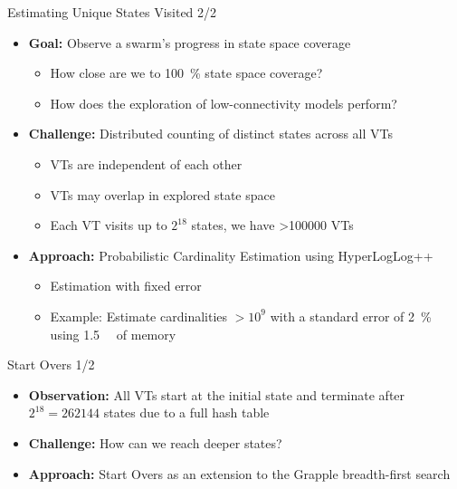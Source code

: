 \documentclass[aspectratio=169]{beamer}
\begin{document}
\begin{frame}{Estimating Unique States Visited 2/2}
    \begin{itemize}
        \item<1-> \textbf{Goal:} Observe a swarm's progress in state space coverage

              \begin{itemize}
                  \item How close are we to \SI{100}{\percent} state space coverage?
                  \item How does the exploration of low-connectivity models perform?
              \end{itemize}

        \item<2-> \textbf{Challenge:} Distributed counting of distinct states across all VTs

              \begin{itemize}
                  \item VTs are independent of each other
                  \item VTs may overlap in explored state space
                  \item Each VT visits up to $2^{18}$ states, we have >\num{100000} VTs
              \end{itemize}

        \item<3-> \textbf{Approach:} Probabilistic Cardinality Estimation using HyperLogLog++

              \begin{itemize}
                  \item Estimation with fixed error
                  \item Example: Estimate cardinalities $>10^9$ with a standard error of \SI{2}{\percent} using \SI{1.5}{\kilo\byte} of memory
              \end{itemize}
    \end{itemize}
\end{frame}

\begin{frame}{Start Overs 1/2}
    \begin{itemize}
        \item \textbf{Observation:} All VTs start at the initial state and terminate after ~$2^{18}=\num{262144}$ states due to a full hash table
        \item \textbf{Challenge:} How can we reach deeper states?
        \item \textbf{Approach:} Start Overs as an extension to the Grapple breadth-first search
    \end{itemize}
\end{frame}
\end{document}
